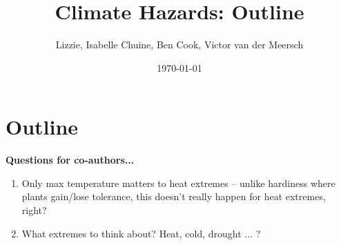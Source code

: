 \documentclass[11pt,letter]{article}
\begin{document}

\renewcommand{\refname}{\CHead{}}

\title{Climate Hazards: Outline}
\author{Lizzie, Isabelle Chuine, Ben Cook, Victor van der Meersch}
\date{\today}
\maketitle

\section{Outline}

{\bf Questions for co-authors...}
\begin{enumerate}
\item Only max temperature matters to heat extremes -- unlike hardiness where plants gain/lose tolerance, this doesn't really happen for heat extremes, right?
\item What extremes to think about? Heat, cold, drought ... ?
\end{enumerate}
\end{document}
